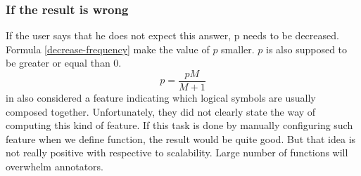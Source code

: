 \subsubsection*{If the result is wrong}
If the user says that he does not expect this answer, p needs to be decreased. Formula \ref{decrease-frequency} make the value of $p$ smaller. $p$ is also supposed to be greater or equal than $0$. 
\begin{equation}
\label{decrease-frequency}
p = \frac{p M}{M+1}
\end{equation}
\citeauthor{Clarke:2010:DSP:1870568.1870571} in \cite{Clarke:2010:DSP:1870568.1870571} also considered a feature indicating which logical symbols are usually composed together. Unfortunately, they did not clearly state the way of computing this kind of feature. If this task is done by manually configuring such feature when we define function, the result would be quite good. But that idea is not really positive with respective to scalability. Large number of functions will overwhelm annotators. 
